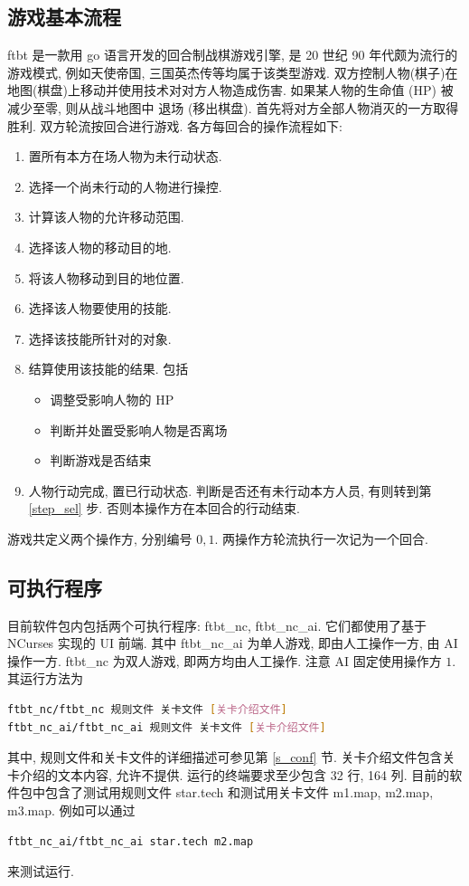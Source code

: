 \documentclass[UTF8, zihao=-4]{ctexart} %
\begin{document}
\subsection{游戏基本流程}
\label{s_intro}
ftbt 是一款用 go 语言开发的回合制战棋游戏引擎, 是 20 世纪 90 年代颇为流行的游戏模式, 例如天使帝国, 三国英杰传等均属于该类型游戏. 
双方控制人物(棋子)在地图(棋盘)上移动并使用技术对对方人物造成伤害. 如果某人物的生命值 (HP) 被减少至零, 则从战斗地图中
退场 (移出棋盘). 首先将对方全部人物消灭的一方取得胜利. 双方轮流按回合进行游戏. 各方每回合的操作流程如下: 
\begin{enumerate}
      \item 置所有本方在场人物为未行动状态.
      \item \label{step_sel}选择一个尚未行动的人物进行操控.
      \item 计算该人物的允许移动范围.
      \item \label{step_move}选择该人物的移动目的地.
      \item 将该人物移动到目的地位置.
      \item \label{step_tech}选择该人物要使用的技能.
      \item \label{step_obj}选择该技能所针对的对象.
      \item 结算使用该技能的结果. 包括
            \begin{itemize}
                  \item 调整受影响人物的 HP
                  \item 判断并处置受影响人物是否离场
                  \item 判断游戏是否结束
            \end{itemize}
      \item 人物行动完成, 置已行动状态. 判断是否还有未行动本方人员, 有则转到第 \ref{step_sel} 步. 否则本操作方在本回合的行动结束.
\end{enumerate}
游戏共定义两个操作方, 分别编号 $0, 1$. 两操作方轮流执行一次记为一个回合.

\subsection{可执行程序}
\label{s_exec}
目前软件包内包括两个可执行程序: ftbt\_nc, ftbt\_nc\_ai. 
它们都使用了基于 NCurses 实现的 UI 前端. 其中 ftbt\_nc\_ai 为单人游戏, 即由人工操作一方, 由 AI 操作一方.
ftbt\_nc 为双人游戏, 即两方均由人工操作. 注意 AI 固定使用操作方 $1$.
其运行方法为
\begin{lstlisting}[language=bash]
ftbt_nc/ftbt_nc 规则文件 关卡文件 [关卡介绍文件]
ftbt_nc_ai/ftbt_nc_ai 规则文件 关卡文件 [关卡介绍文件]
\end{lstlisting}
其中, 规则文件和关卡文件的详细描述可参见第 \ref{s_conf} 节. 关卡介绍文件包含关卡介绍的文本内容, 允许不提供.
运行的终端要求至少包含 32 行, 164 列.
目前的软件包中包含了测试用规则文件 star.tech 和测试用关卡文件 m1.map, m2.map, m3.map.
例如可以通过
\begin{lstlisting}[language=bash]
ftbt_nc_ai/ftbt_nc_ai star.tech m2.map
\end{lstlisting}
来测试运行.
\end{document}
